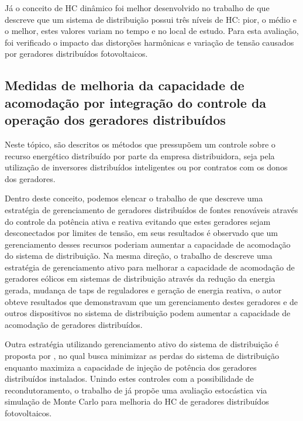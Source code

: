 Já o conceito de HC dinâmico foi melhor desenvolvido no trabalho de  que descreve que um sistema de distribuição possui três níveis de HC: pior, o médio e o melhor, estes valores variam no tempo e no local de estudo. Para esta avaliação, foi verificado o impacto das distorções harmônicas e variação de tensão causados por geradores distribuídos fotovoltaicos.

\subsection{Medidas de melhoria da capacidade de acomodação por integração do controle da operação dos geradores distribuídos} \label{hc_review_control_dg}

Neste tópico, são descritos os métodos que pressupõem um controle sobre o recurso energético distribuído por parte da empresa distribuidora, seja pela utilização de inversores distribuídos inteligentes ou por contratos com os donos dos geradores.

Dentro deste conceito, podemos elencar o trabalho de  que descreve uma estratégia de gerenciamento de geradores distribuídos de fontes renováveis através do controle da potência ativa e reativa evitando que estes geradores sejam desconectados por limites de tensão, em seus resultados é observado que um gerenciamento desses recursos poderiam aumentar a capacidade de acomodação do sistema de distribuição. Na mesma direção, o trabalho de  descreve uma estratégia de gerenciamento ativo para melhorar a capacidade de acomodação de geradores eólicos em sistemas de distribuição através da redução da energia gerada, mudança de taps de reguladores e geração de energia reativa, o autor obteve resultados que demonstravam que um gerenciamento destes geradores e de outros dispositivos no sistema de distribuição podem aumentar a capacidade de acomodação de geradores distribuídos. 

Outra estratégia utilizando gerenciamento ativo do sistema de distribuição é proposta por , no qual busca minimizar as perdas do sistema de distribuição enquanto maximiza a capacidade de injeção de potência dos geradores distribuídos instalados. Unindo estes controles com a possibilidade de recondutoramento, o trabalho de  já propõe uma avaliação estocástica via simulação de Monte Carlo para melhoria do HC de geradores distribuídos fotovoltaicos. 


